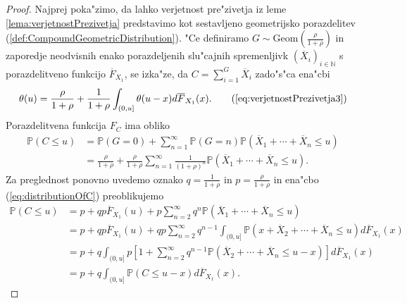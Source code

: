 \documentclass[12pt, a4paper, reqno]{amsart}
\theoremstyle{definition}
\theoremstyle{plain}
\newcommand{\N}{\mathbb{N}}
\newcommand{\Prob}{\mathbb{P}}
\newcommand{\1}{\mathds{1}}
\begin{document}
        \begin{proof}
            Najprej poka"zimo, da lahko verjetnost 
            pre"zivetja iz leme \ref{lema:verjetnostPrezivetja} 
            predstavimo kot sestavljeno 
            geometrijsko porazdelitev (\ref{def:CompoundGeometricDistribution}). "Ce definiramo 
            $G \sim \text{Geom}(\frac{\rho}{1 + \rho})$ in zaporedje neodvisnih enako porazdeljenih 
            slu"cajnih spremenljivk $(\overline{X}_i)_{i\in\N}$ s porazdelitveno funkcijo $\overline{F}_{X_1}$, 
            se izka"ze, da $C = \sum_{i=1}^{G}\overline{X}_i$ zado"s"ca ena"cbi 
            \begin{equation}
                \theta(u) = \frac{\rho}{1 + \rho} + \frac{1}{1 + \rho}\int_{(0, u]}\theta(u - x)d\overline{F}_{X_1}(x).
                \tag{\ref{eq:verjetnostPrezivetja3}}
            \end{equation}
            Porazdelitvena funkcija $F_C$ ima obliko
            \begin{align}
                \Prob\left(C \leq u\right)  &= \Prob\left(G = 0\right) + \sum_{n = 1}^\infty\Prob\left(G = n\right)\Prob\left(\overline{X}_1 + \cdots + \overline{X}_{n} \leq u\right) \nonumber\\
                                            &= \frac{\rho}{1 + \rho} + \frac{\rho}{1 + \rho}\sum_{n = 1}^\infty\frac{1}{(1 + \rho)^n}\Prob\left(\overline{X}_1 + \cdots + \overline{X}_{n} \leq u\right). \label{eq:distributionOfC}
            \end{align}
            Za preglednost ponovno uvedemo oznako $q= \frac{1}{1 + \rho}$ in 
             $p = \frac{\rho}{1 + \rho}$ in ena"cbo (\ref{eq:distributionOfC}) preoblikujemo 
            \begin{align*}
                \Prob\left(C \leq u\right)  
                    &= p + qp\overline{F}_{X_1}(u) + p\sum_{n = 2}^\infty q^{n}\Prob\left(\overline{X}_1 + \cdots + \overline{X}_{n} \leq u\right) \\
                    &= p + qp\overline{F}_{X_1}(u) + qp\sum_{n = 2}^\infty q^{n-1}\int_{(0, u]}\Prob\left(x + \overline{X}_2 + \cdots + \overline{X}_{n} \leq u\right)d\overline{F}_{X_1}(x) \\
                    &= p + q\int_{(0, u]}p\left[1 + \sum_{n = 2}^\infty q^{n-1}\Prob\left(\overline{X}_2 + \cdots + \overline{X}_n \leq u - x\right)\right]d\overline{F}_{X_1}(x) \\
                    &= p + q\int_{(0, u]}\Prob\left(C \leq u - x\right)d\overline{F}_{X_1}(x).
            \end{align*}

\end{proof}
\end{document}

